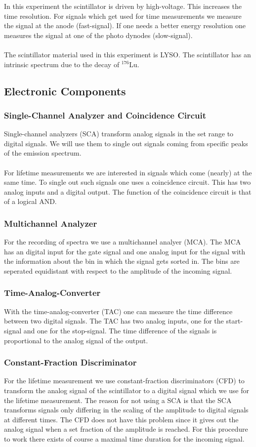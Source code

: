 In this experiment the scintillator is driven by high-voltage. This increases the time resolution. For signals which get used for time measurements we measure the signal at the anode (fast-signal). If one needs a better energy resolution one measures the signal at one of the photo dynodes (slow-signal).\\ \\
The scintillator material used in this experiment is LYSO. The scintillator has an intrinsic spectrum due to the decay of $^{176}$Lu. 
\subsection{Electronic Components}

\subsubsection*{Single-Channel Analyzer and Coincidence Circuit}
Single-channel analyzers (SCA) transform analog signals in the set range to digital signals. We will use them to single out signals coming from specific peaks of the emission spectrum.\\ \\
For lifetime measurements we are interested in signals which come (nearly) at the same time. To single out such signals one uses a coincidence circuit. This has two analog inputs and a digital output. The function of the coincidence circuit is that of a logical AND.
\subsubsection*{Multichannel Analyzer}
For the recording of spectra we use a multichannel analyer (MCA). The MCA has an digital input for the gate signal and one analog input for the signal with the information about the bin in which the signal gets sorted in. The bins are seperated equidistant with respect to the amplitude of the incoming signal.

\subsubsection*{Time-Analog-Converter}
With the time-analog-converter (TAC) one can measure the time difference between two digital signals. The TAC has two analog inputs, one for the start-signal and one for the stop-signal. The time difference of the signals is proportional to the analog signal of the output.

\subsubsection*{Constant-Fraction Discriminator}
For the lifetime measurement we use constant-fraction discriminators (CFD) to transform the analog signal of the scintillator to a digital signal which we use for the lifetime measurement. The reason for not using a SCA is that the SCA transforms signals only differing in the scaling of the amplitude to digital signals at different times. The CFD does not have this problem since it gives out the analog signal when a set fraction of the amplitude is reached. For this procedure to work there exists of course a maximal time duration for the incoming signal.

